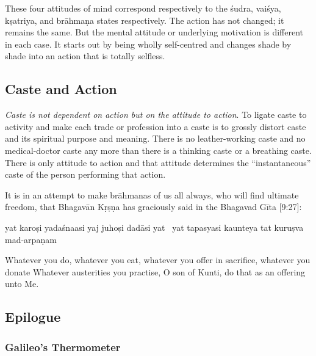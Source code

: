 \documentclass[
  a4paper,
]{article}
\begin{document}
These four attitudes of mind correspond respectively to the śudra,
vaiśya, kṣatriya, and brāhmaṇa states respectively. The action has not
changed; it remains the same. But the mental attitude or underlying
motivation is different in each case. It starts out by being wholly
self-centred and changes shade by shade into an action that is totally
selfless.

\subsection{Caste and Action}\label{caste-and-action}

\emph{Caste is not dependent on action but on the attitude to action}.
To ligate caste to activity and make each trade or profession into a
caste is to grossly distort caste and its spiritual purpose and meaning.
There is no leather-working caste and no medical-doctor caste any more
than there is a thinking caste or a breathing caste. There is only
attitude to action and that attitude determines the ``instantaneous''
caste of the person performing that action.

It is in an attempt to make brāhmanas of us all always, who will find
ultimate freedom, that Bhagavān Kṛṣṇa has graciously said in the
Bhagavad Gīta {[}9:27{]}:

yat karoṣi yadaśnaasi yaj juhoṣi dadāsi yat~ yat tapasyasi kaunteya tat
kuruṣva mad-arpaṇam~

Whatever you do, whatever you eat, whatever you offer in sacrifice,
whatever you donate Whatever austerities you practise, O son of Kunti,
do that as an offering unto Me.

\subsection{Epilogue}\label{epilogue}

\subsubsection{Galileo's Thermometer}\label{galileos-thermometer}
\end{document}
